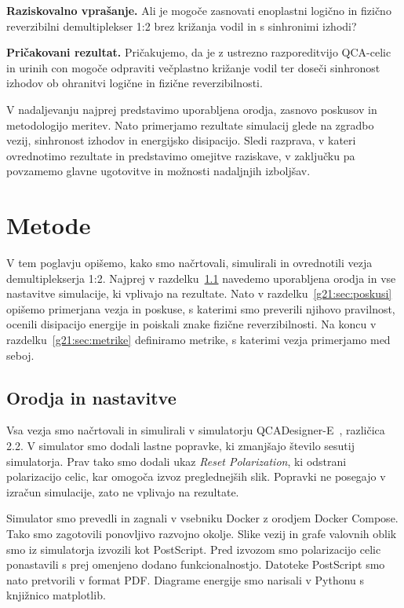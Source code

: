 \documentclass[graybox, envcountchap]{svmult}
\begin{document}
\begin{svgraybox}
\textbf{Raziskovalno vprašanje.}
Ali je mogoče zasnovati enoplastni logično in fizično reverzibilni demultiplekser 1:2 brez križanja vodil in s sinhronimi izhodi?

\medskip
\textbf{Pričakovani rezultat.}
Pričakujemo, da je z ustrezno razporeditvijo QCA-celic in urinih con mogoče odpraviti večplastno križanje vodil ter doseči sinhronost izhodov ob ohranitvi logične in fizične reverzibilnosti.
\end{svgraybox}

V nadaljevanju najprej predstavimo uporabljena orodja, zasnovo poskusov in metodologijo meritev. Nato primerjamo rezultate simulacij glede na zgradbo vezij, sinhronost izhodov in energijsko disipacijo. Sledi razprava, v kateri ovrednotimo rezultate in predstavimo omejitve raziskave, v zaključku pa povzamemo glavne ugotovitve in možnosti nadaljnjih izboljšav.

\section{Metode}
\label{g21:sec:metode}

V tem poglavju opišemo, kako smo načrtovali, simulirali in ovrednotili vezja demultiplekserja 1:2. Najprej v razdelku~\ref{g21:sec:orodja} navedemo uporabljena orodja in vse nastavitve simulacije, ki vplivajo na rezultate. Nato v razdelku~\ref{g21:sec:poskusi} opišemo primerjana vezja in poskuse, s katerimi smo preverili njihovo pravilnost, ocenili disipacijo energije in poiskali znake fizične reverzibilnosti. Na koncu v razdelku~\ref{g21:sec:metrike} definiramo metrike, s katerimi vezja primerjamo med seboj.

\subsection{Orodja in nastavitve}
\label{g21:sec:orodja}

Vsa vezja smo načrtovali in simulirali v simulatorju QCADesigner-E~\cite{qcadesignere}, različica 2.2. V simulator smo dodali lastne popravke, ki zmanjšajo število sesutij simulatorja. Prav tako smo dodali ukaz \emph{Reset Polarization}, ki odstrani polarizacijo celic, kar omogoča izvoz preglednejših slik. Popravki ne posegajo v izračun simulacije, zato ne vplivajo na rezultate.

Simulator smo prevedli in zagnali v vsebniku Docker z orodjem Docker Compose. Tako smo zagotovili ponovljivo razvojno okolje. Slike vezij in grafe valovnih oblik smo iz simulatorja izvozili kot PostScript. Pred izvozom smo polarizacijo celic ponastavili s prej omenjeno dodano funkcionalnostjo. Datoteke PostScript smo nato pretvorili v format PDF. Diagrame energije smo narisali v Pythonu s knjižnico matplotlib.
\end{document}

